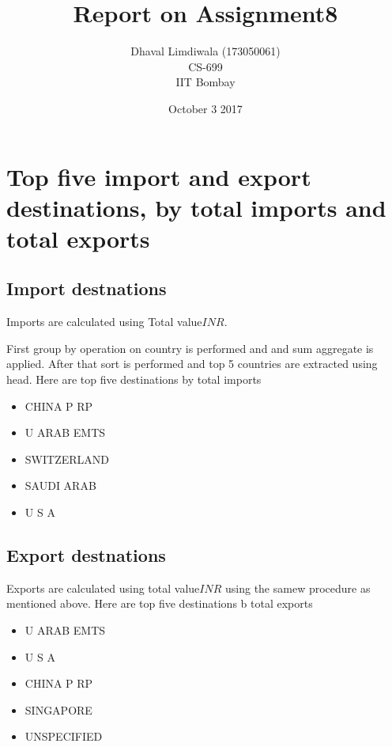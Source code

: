 \documentclass[12pt]{article}
\title{Report on Assignment8 }
\author{Dhaval Limdiwala (173050061) \\ CS-699 \\ IIT Bombay}
\date{October 3 2017}
\begin{document}
\maketitle
\pagebreak
\tableofcontents
\pagebreak
\pagebreak
\listoffigures
\pagebreak
\section{Top five import and export destinations, by total imports and total exports}
\subsection{Import destnations}
\par {\ttfamily Imports are calculated using {\huge Total value\(INR\)}.}
\par First group by operation on country is performed and and sum aggregate is applied. After that sort is performed and top 5 countries are extracted using head.
Here are top five destinations by total imports

\begin{itemize}
	\item CHINA P RP
	\item U ARAB EMTS
	\item SWITZERLAND
	\item SAUDI ARAB
	\item U S A	
\end{itemize}
\subsection{Export destnations}
\par {\sffamily Exports are calculated using total value\(INR\) using the samew procedure as mentioned above.}
Here are top five destinations b total exports
\begin{itemize}
	\item U ARAB EMTS
	\item U S A
	\item CHINA P RP
	\item SINGAPORE
	\item UNSPECIFIED
\end{itemize}
\end{document}
